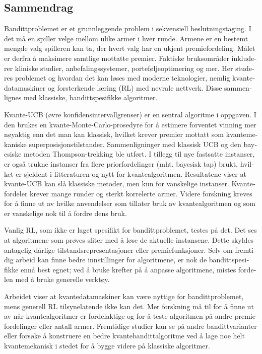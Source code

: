 \begin{otherlanguage}{norsk}

  \chapter{Sammendrag}
  Bandittproblemet er et grunnleggende problem i sekvensiell beslutningstaging.
  I det må en spiller velge mellom ulike armer i hver runde.
  Armene er en bestemt mengde valg spilleren kan ta, der hvert valg har en ukjent premiefordeling.
  Målet er derfra å maksimere samtlige mottatte premier.
  Faktiske bruksområder inkluderer kliniske studier, anbefalingssystemer, porteføljeoptimering og mer.
  Her studeres problemet og hvordan det kan løses med moderne teknologier, nemlig kvantedatamaskiner og forsterkende læring (RL) med nevrale nettverk.
  Disse sammenlignes med klassiske, bandittspesifikke algoritmer.

  Kvante-UCB (øvre konfidensintervallgrenser) er en sentral algoritme i oppgaven.
  I den brukes en kvante-Monte-Carlo-prosedyre for å estimere forventet vinning mer nøyaktig enn det man kan klassisk, hvilket krever premier mottatt som kvantemekaniske superposisjonstilstander.
  Sammenligninger med klassisk UCB og den bayesiske metoden Thompson-trekking ble utført.
  I tillegg til nye fastsatte instanser, er også trukne instanser fra flere priorfordelinger (mht. bayesisk tap) brukt, hvilket er sjeldent i litteraturen og nytt for kvantealgoritmen.
  Resultatene viser at kvante-UCB kan slå klassiske metoder, men kun for vanskelige instanser.
  Kvantefordeler krever mange runder og sterkt korrelerte armer.
  Videre forskning kreves for å finne ut av hvilke anvendelser som tillater bruk av kvantealgoritmen og som er vanskelige nok til å fordre dens bruk.

  Vanlig RL, som ikke er laget spesifikt for bandittproblemet, testes på det.
  Det ses at algoritmene som prøves sliter med å løse de aktuelle instansene.
  Dette skyldes antagelig dårlige tilstandsrepresentasjoner eller premiefunksjoner.
  Selv om fremtidig arbeid kan finne bedre innstillinger for algoritmene, er nok de bandittspesifikke ennå best egnet; ved å bruke krefter på å anpasse algoritmene, mistes fordelen med å bruke generelle verktøy.

  Arbeidet viser at kvantedatamaskiner kan være nyttige for bandittproblemet, mens generell RL tilsynelatende ikke kan det.
  Mer forskning må til for å finne ut av når kvantealgoritmer er fordelaktige og for å teste algoritmen på andre premiefordelinger eller antall armer.
  Fremtidige studier kan se på andre bandittvarianter eller forsøke å konstruere en bedre kvantebandittalgoritme ved å lage noe helt kvantemekanisk i stedet for å bygge videre på klassiske algoritmer.

\end{otherlanguage}

\cleardoublepage